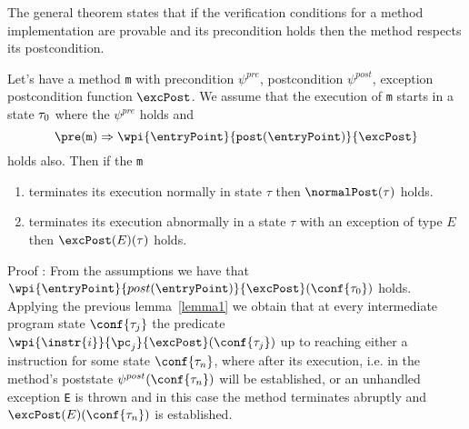 The general theorem states that if the verification conditions for 
a method implementation are provable and its precondition holds then the method respects its postcondition.


\begin{th1} \label{th1}
Let's have a method \texttt{m}  with precondition $\psi^{pre}$, postcondition $\psi^{post}$, exception postcondition function $\excPost$. We assume that 
the execution of \texttt{m} starts in a state $\tau_{0}$ where the  $\psi^{pre}$ holds and 
$$\pre (\tt{m}) \Rightarrow \wpi{\entryPoint}{post(\entryPoint)}{\excPost}$$ holds also. Then if  the \texttt{m}
\begin{enumerate}
	\item terminates its execution normally in state $\tau$ then $\normalPost(\tau)$ holds.  
	\item terminates its execution abnormally in a state $\tau$ with an exception of type $E$ then  $\excPost(E)(\tau)$ holds.
                        
\end{enumerate}
\end{th1}
Proof : 
From the assumptions we have that  $\wpi{\entryPoint}{post(\entryPoint)} {\excPost}(\conf{\state{0}}) $ holds. 
Applying the previous lemma~\ref{lemma1} we obtain that at every intermediate program state 
$\conf{\state{j}}$ the predicate  $\wpi{\instr{i} }{\pc_j} {\excPost}(\conf{\state{j}}) $ up to reaching either a  instruction for some state
$\conf{\state{n}}$, where 
after its execution, i.e. in the method's poststate $\psi^{post}(\conf{\state{n}})$ will be established, or an unhandled exception \texttt{E} is thrown and in this case the method terminates
abruptly and   $\excPost(E)(\conf{\state{n}})$ is established. 



